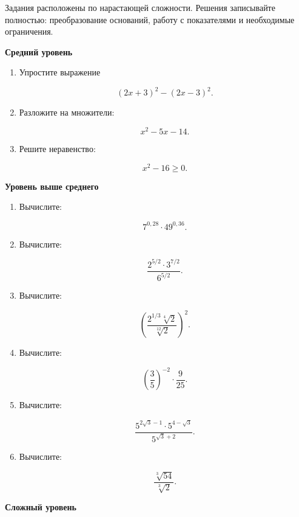 \documentclass[a4paper,12pt]{article}
\newcommand{\SubSection}[1]{%
  \vspace{0.5em}
  {\large\bfseries\color{accent}#1\par}
  \vspace{0.2em}
}
\begin{document}
\vspace{0.5cm}

Задания расположены по нарастающей сложности.
Решения записывайте полностью: преобразование оснований,
работу с показателями и необходимые ограничения.

\SubSection{Средний уровень}

\begin{enumerate}[label=\textbf{\arabic*.}]

\item
Упростите выражение

\[
(2x+3)^2-(2x-3)^2.
\]

\item
Разложите на множители:

\[
x^2-5x-14.
\]

\item
Решите неравенство:

\[
x^2-16\ge0.
\]

\end{enumerate}

\SubSection{Уровень выше среднего}

\begin{enumerate}[label=\textbf{\arabic*.},start=4]

\item
Вычислите:

\[
7^{0{,}28}\cdot49^{0{,}36}.
\]

\item
Вычислите:

\[
\frac{
2^{5/2}\cdot3^{7/2}
}{
6^{5/2}
}.
\]

\item
Вычислите:

\[
\left(
\frac{
2^{1/3}\sqrt[4]{2}
}{
\sqrt[12]{2}
}
\right)^2.
\]

\item
Вычислите:

\[
\left(\frac35\right)^{-2}
\cdot
\frac9{25}.
\]

\item
Вычислите:

\[
\frac{
5^{2\sqrt3-1}\cdot5^{4-\sqrt3}
}{
5^{\sqrt3+2}
}.
\]

\item
Вычислите:

\[
\frac{\sqrt[3]{54}}{\sqrt[3]{2}}.
\]

\end{enumerate}

\SubSection{Сложный уровень}
\end{document}

